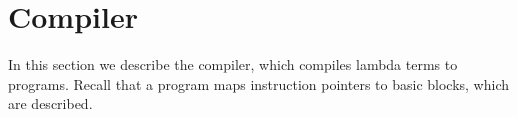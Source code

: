 \section{Compiler} \label{sec:compiler}

In this section we describe the compiler, which compiles lambda terms to
programs. Recall that a program maps instruction pointers to basic blocks, which
are described. 
